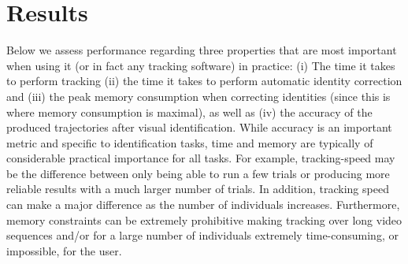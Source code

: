 \documentclass[9pt,lineno]{elife}
\newcommand{\TRex}{\protect\path{TRex}}
\begin{document}

\section{Results} \label{sec:methods_evaluation}

Below we assess \TRex{'} performance regarding three properties that are most important when using it (or in fact any tracking software) in practice: (i) The time it takes to perform tracking (ii) the time it takes to perform automatic identity correction and (iii) the peak memory consumption when correcting identities (since this is where memory consumption is maximal), as well as (iv) the accuracy of the produced trajectories after visual identification.
While accuracy is an important metric and specific to identification tasks, time and memory are typically of considerable practical importance for all tasks. For example, tracking-speed may be the difference between only being able to run a few trials or producing more reliable results with a much larger number of trials. In addition, tracking speed can make a major difference as the number of individuals increases. Furthermore, memory constraints can be extremely prohibitive making tracking over long video sequences and/or for a large number of individuals extremely time-consuming, or impossible, for the user.
\end{document}
